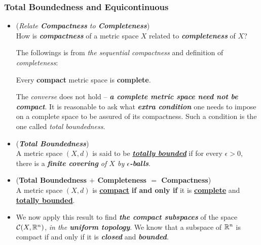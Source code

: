 \documentclass[11pt]{article}
\begin{document}
\subsubsection{Total Boundedness and Equicontinuous}
\begin{itemize}
\item \begin{remark} (\emph{Relate \textbf{Compactness} to \textbf{Completeness}})\\
How is \emph{\textbf{compactness}} of a metric space $X$ related to \emph{\textbf{completeness}} of $X$? 

The followings is from \emph{the sequential compactness} and definition of \emph{completeness}:
\begin{proposition}
Every \textbf{compact} metric space is \textbf{complete}.
\end{proposition}
The \emph{converse} does not hold -- \emph{\textbf{a complete metric space need not be compact}}. It is reasonable to ask what \emph{\textbf{extra condition}} one needs to impose on a complete space to be assured of its compactness.
Such a condition is the one called \emph{total boundedness}.
\end{remark}

\item \begin{definition} (\emph{\textbf{Total Boundedness}})\\
A metric space $(X, d)$ is said to be \underline{\emph{\textbf{totally bounded}}} if for every $\epsilon > 0$, there is a \emph{\textbf{finite covering} of $X$ by \textbf{$\epsilon$-balls}}.
\end{definition}

\item \begin{theorem} (\textbf{Total Boundedness  $+$ Completeness $=$ Compactness})\citep{munkres2000topology}\\
A metric space $(X, d)$ is \underline{\textbf{compact}} \textbf{if and only if} it is \underline{\textbf{complete}} and \underline{\textbf{totally bounded}}.
\end{theorem}

\item \begin{remark}
We now apply this result to find \emph{\textbf{the compact subspaces}} of the space ${\mathcal C}(X, {\mathbb R}^n)$, \emph{in the \textbf{uniform topology}}. We know that a subspace of ${\mathbb R}^n$ is compact if and only if it is \emph{\textbf{closed}} and \emph{\textbf{bounded}}. 


\end{remark}
\end{itemize}
\end{document}
